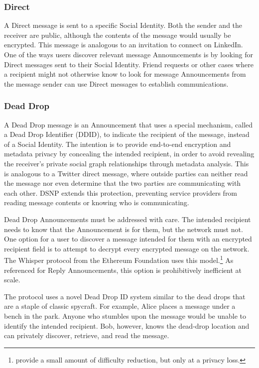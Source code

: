 \documentclass[12pt,letterpaper]{article}
\begin{document}
\subsubsection{Direct}

A Direct message is sent to a specific Social Identity. Both the sender and the receiver are
public, although the contents of the message would usually be encrypted. This message is
analogous to an invitation to connect on LinkedIn. One of the ways users discover relevant
message Announcements is by looking for Direct messages sent to their Social
Identity. Friend requests or other cases where a recipient might not otherwise know to look
for message Announcements from the message sender can use Direct messages to establish
communications.

\subsubsection{Dead Drop}

A Dead Drop message is an Announcement that uses a special mechanism, called a Dead Drop
Identifier (DDID), to indicate the recipient of the message, instead of a Social Identity.
The intention is to provide end-to-end encryption and metadata privacy by concealing the
intended recipient, in order to avoid revealing the receiver's private social graph
relationships through metadata analysis. This is analogous to a Twitter direct message,
where outside parties can neither read the message nor even determine that the two parties
are communicating with each other. DSNP extends this protection, preventing service
providers from reading message contents or knowing who is communicating.

Dead Drop Announcements must be addressed with care. The intended recipient needs to know
that the Announcement is for them, but the network must not. One option for a user to
discover a message intended for them with an encrypted recipient field is to attempt to
decrypt every encrypted message on the network. The Whisper protocol from the Ethereum
Foundation uses this model.\footnote{ provide a small amount of difficulty
	reduction, but only at a privacy loss.\cite{whisper-how}} As referenced for Reply
Announcements, this option is prohibitively inefficient at scale.

The protocol uses a novel Dead Drop ID system similar to the dead drops that are a staple
of classic spycraft. For example, Alice places a message under a bench in the park. Anyone
who stumbles upon the message would be unable to identify the intended recipient. Bob,
however, knows the dead-drop location and can privately discover, retrieve, and read the
message.
\end{document}
